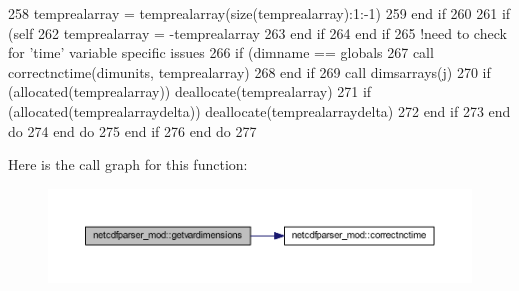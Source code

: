 \begin{DoxyCode}
258                                 temprealarray = temprealarray(\textcolor{keyword}{size}(temprealarray):1:-1)
259 \textcolor{keywordflow}{                            end if}
260 
261                             \textcolor{keywordflow}{if} (self%
262                                 temprealarray = -temprealarray
263 \textcolor{keywordflow}{                            end if}
264 \textcolor{keywordflow}{                        end if}
265                         \textcolor{comment}{!need to check for 'time' variable specific issues}
266                         \textcolor{keywordflow}{if} (dimname == globals%
267                             \textcolor{keyword}{call }correctnctime(dimunits, temprealarray)
268 \textcolor{keywordflow}{                        end if}
269                         \textcolor{keyword}{call }dimsarrays(j)%
270                         \textcolor{keywordflow}{if} (\textcolor{keyword}{allocated}(temprealarray)) \textcolor{keyword}{deallocate}(temprealarray)
271                         \textcolor{keywordflow}{if} (\textcolor{keyword}{allocated}(temprealarraydelta)) \textcolor{keyword}{deallocate}(temprealarraydelta)
272 \textcolor{keywordflow}{                    end if}
273 \textcolor{keywordflow}{                end do}
274 \textcolor{keywordflow}{            end do}
275 \textcolor{keywordflow}{        end if}
276 \textcolor{keywordflow}{    end do}
277 
\end{DoxyCode}
Here is the call graph for this function\+:\nopagebreak
\begin{figure}[H]
\begin{center}
\leavevmode
\includegraphics[width=350pt]{namespacenetcdfparser__mod_a0aea819b8a474ce2f4840d0bc44e95ec_cgraph}
\end{center}
\end{figure}
\mbox{\label{namespacenetcdfparser__mod_ac01c000a97d23613684155708249ce89}} 
